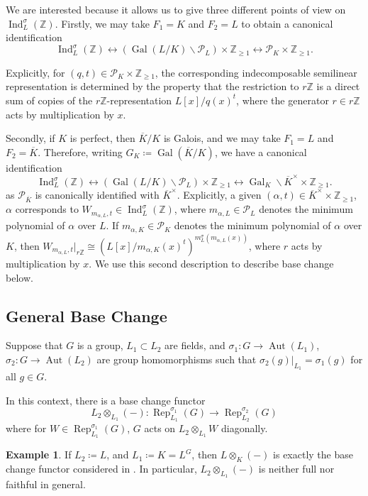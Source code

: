 \documentclass[10pt, reqno, hidelinks]{amsart}
\DeclareMathOperator{\Gal}{Gal}
\DeclareMathOperator{\Rep}{Rep}
\DeclareMathOperator{\Ind}{Ind}
\DeclareMathOperator{\Aut}{Aut}
\newcommand{\bZ}{{\mathbb Z}}
\newcommand{\sP}{{\mathcal P}}
\numberwithin{thm}{subsection}
\theoremstyle{definition}
\newtheorem{eg}[thm]{Example}
\begin{document}
We are interested because it allows us to give three different points of view on $\Ind_L^{\sigma}(\bZ)$. Firstly, we may take $F_1 = K$ and $F_2 = L$ to obtain a canonical identification
\[
\Ind_L^{\sigma}(\bZ) \leftrightarrow (\Gal(L/K) \backslash \sP_L) \times \bZ_{\geq 1} \leftrightarrow \sP_K \times \bZ_{\geq 1}.
\]

Explicitly, for $(q,t) \in \sP_K \times \bZ_{\geq 1}$, the corresponding indecomposable semilinear representation is determined by the property that the restriction to $r \bZ$ is a direct sum of copies of the $r \bZ$-representation $L[x] / q(x)^t$, where the generator $r \in r\bZ$ acts by multiplication by $x$.

Secondly, if $K$ is perfect, then $\overline{K} / K$ is Galois, and we may take $F_1 = L$ and $F_2 = \overline{K}$. Therefore, writing $G_K \coloneqq \Gal(\overline{K} / K)$, we have a canonical identification 
\[
\Ind_L^{\sigma}(\bZ) \leftrightarrow (\Gal(L/K) \backslash \sP_L) \times \bZ_{\geq 1} \leftrightarrow \Gal_K \! \backslash \overline{K}^{\times} \times \bZ_{\geq 1}.
\] 
as $\sP_{\overline{K}}$ is canonically identified with $\overline{K}^{\times}$. Explicitly, a given $(\alpha,t) \in \overline{K}^{\times} \times \bZ_{\geq 1}$, $\alpha$ corresponds to $W_{m_{\alpha, L}, t} \in \Ind_{L}^{\sigma}(\bZ)$, where $m_{\alpha, L} \in \sP_L$ denotes the minimum polynomial of $\alpha$ over $L$. If $m_{\alpha, K} \in \sP_K$ denotes the minimum polynomial of $\alpha$ over $K$, then $W_{m_{\alpha, L}, t}|_{r \bZ} \cong (L[x] / m_{\alpha, K}(x)^t)^{m_L^{\sigma}(m_{\alpha, L}(x))}$, where $r$ acts by multiplication by $x$.
We use this second description to describe base change below.

\subsection{General Base Change}

Suppose that $G$ is a group, $L_1 \subset L_2$ are fields, and $\sigma_1 \colon G \rightarrow \Aut(L_1)$, $\sigma_2 \colon G \rightarrow \Aut(L_2)$ are group homomorphisms such that $\sigma_2(g)|_{L_1} = \sigma_1(g)$ for all $g \in G$.

In this context, there is a base change functor
\[
L_2 \otimes_{L_1} (-) \colon \Rep_{L_1}^{\sigma_1}(G) \rightarrow \Rep_{L_2}^{\sigma_2}(G)
\]
where for $W \in \Rep_{L_1}^{\sigma_1}(G)$, $G$ acts on $L_2 \otimes_{L_1} W$ diagonally.

\begin{eg}
If $L_2 \coloneqq L$, and $L_1 \coloneqq K = L^G$, then $L \otimes_K (-)$ is exactly the base change functor considered in \cite[\S 4]{TAYSchur}. In particular, $L_2 \otimes_{L_1} (-)$ is neither full nor faithful in general.
\end{eg}
\end{document}
